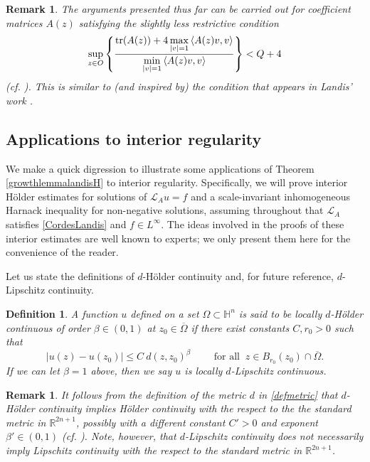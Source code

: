 \documentclass[12pt]{amsart}
\newtheorem{Definition}[Theorem]{Definition}
\newtheorem{Remark}[Theorem]{Remark}
\newcommand{\R}{{\mathbb R}}
\def \H {{\mathbb H}}
\def \L {\mathcal{L}}
\def \O {\Omega}
\begin{document}
\begin{Remark}
The arguments presented thus far can be carried out for coefficient matrices $A(z)$ satisfying the slightly less restrictive condition
$$
\sup_{z\in O}\left\{\frac{{\rm{tr}}(A(z)) + 4 \max\limits_{|v|=1}\left\langle A(z)v,v \right\rangle }{\min\limits_{|v|=1}\left\langle A(z)v,v \right\rangle}\right\}<Q+4
$$
(cf. \cite[condition (1.2)]{T2014}). This is similar to (and inspired by) the condition that appears in Landis' work \cite{LandisBook, LandisDokl}.
\end{Remark}



\subsection{Applications to interior regularity}

We make a quick digression to illustrate some applications of Theorem \ref{growthlemmalandisH} to interior regularity. Specifically, we will prove interior H\"older estimates for solutions of $\L_A u =f$ and a scale-invariant inhomogeneous Harnack inequality for non-negative solutions, assuming throughout that $\L_A$ satisfies \eqref{CordesLandis} and $f \in L^{\infty}$. The ideas involved in the proofs of these interior estimates are well known to experts; we only present them here for the convenience of the reader.

Let us state the definitions of $d$-H\"older continuity and, for future reference, $d$-Lipschitz continuity.

\begin{Definition}
A function $u$ defined on a set $\O \subset \H^n$ is said to be locally $d$-H\"older continuous of order $\beta \in (0,1)$ at $z_0 \in \overline{\O}$ if there exist constants $C, r_0 >0$ such that
$$|u(z) - u(z_0)| \leq C \ d(z, z_0)^{\beta} \qquad \text{ for all } \ z \in B_{r_0}(z_0) \cap \overline{\O}.$$
If we can let $\beta = 1$ above, then we say $u$ is locally $d$-Lipschitz continuous.
\end{Definition}

\begin{Remark}
It follows from the definition of the metric $d$ in \eqref{defmetric} that $d$-H\"older continuity implies H\"older continuity with the respect to the the standard metric in $\R^{2n+1}$, possibly with a different constant $C' > 0$ and exponent $\beta' \in (0,1)$ (cf. \cite[Proposition 5.1.6]{BLU2007}). Note, however, that $d$-Lipschitz continuity does not necessarily imply Lipschitz continuity with the respect to the standard metric in $\R^{2n+1}$.
\end{Remark}
\end{document}
